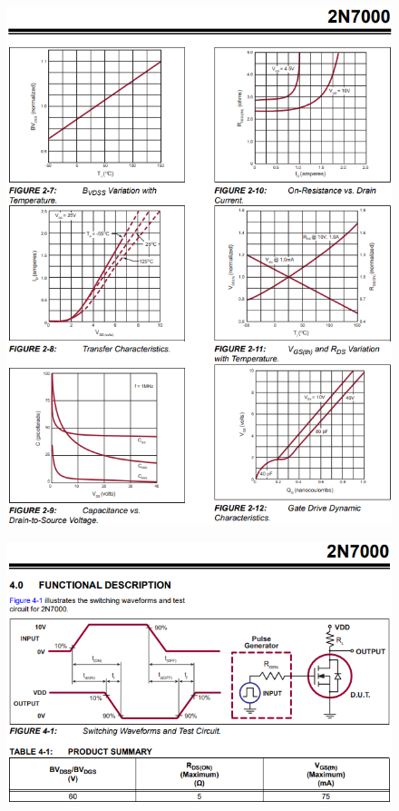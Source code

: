 \begin{figure}[h]
    \centering
    \includegraphics[width=0.9\linewidth]{Appendices/2N7000_4.png}
    \label{2N7000_4}
\end{figure}
\begin{figure}[h]
    \centering
    \includegraphics[width=0.9\linewidth]{Appendices/2N7000_5.png}
    \label{2N7000_5}
\end{figure}
\FloatBarrier

